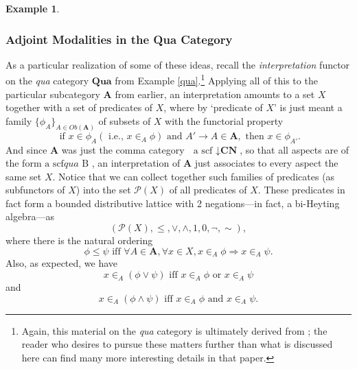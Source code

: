 \documentclass[11pt]{book}
\theoremstyle{definition}
\newtheorem{example}{Example}[section]
\theoremstyle{definition}
\theoremstyle{definition}
\theoremstyle{theorem}
\theoremstyle{definition}
\begin{document}
\begin{example}
	\subsubsection{Adjoint Modalities in the Qua Category}
	As a particular realization of some of these ideas, recall the \textit{interpretation} functor on the \textit{qua} category $\textbf{Qua}$ from Example \ref{qua}.\footnote{Again, this material on the \textit{qua} category is ultimately derived from \cite{la_palme_reyes_models_1999}; the reader who desires to pursue these matters further than what is discussed here can find many more interesting details in that paper.} Applying all of this to the particular subcategory $\textbf{A}$ from earlier, an interpretation amounts to a set $X$ together with a set of predicates of $X$, where by `predicate of $X$' is just meant a family $\{\phi_A \}_{A \in Ob(\textbf{A})}$ of subsets of $X$ with the functorial property
	\begin{equation*}
	\text{ if } x \in \phi_A (\text{ i.e., } x \in_A \phi) \text{ and } A' \rightarrow A \in \textbf{A}, \text{ then } x \in \phi_{A'}. 
	\end{equation*}
	And since $\textbf{A}$ was just the comma category $\boxed{\text{ a scf }} \downarrow \textbf{CN}$, so that all aspects are of the form $\boxed{\text{a scf}}qua \boxed{\text{ B }}$, an interpretation of $\textbf{A}$ just associates to every aspect the same set $X$. Notice that we can collect together such families of predicates (as subfunctors of $X$) into the set $\mathcal{P}(X)$ of all predicates of $X$. These predicates in fact form a bounded distributive lattice with 2 negations---in fact, a bi-Heyting algebra---as
	\begin{equation*}
	(\mathcal{P}(X), \leq, \vee, \wedge, 1, 0, \neg, \sim),
	\end{equation*} 
	where there is the natural ordering 
	\begin{equation*}
	\phi \leq \psi \text{ iff } \forall A \in \textbf{A}, \forall x \in X, x \in_A \phi \Rightarrow x \in_A \psi.
	\end{equation*} 
	Also, as expected, we have 
	\begin{equation*}
	x \in_A (\phi \vee \psi) \text{ iff } x \in_A \phi \text{ or } x \in_A \psi 
	\end{equation*}
	and 
	\begin{equation*}
	x \in_A (\phi \wedge \psi) \text{ iff } x \in_A \phi \text{ and } x \in_A \psi . 

\end{equation*}
\end{example}
\end{document}
